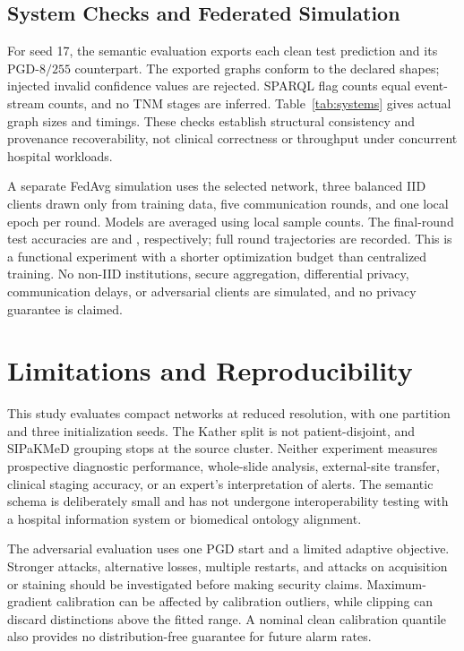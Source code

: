 \documentclass{svproc}
\begin{document}
\subsection{System Checks and Federated Simulation}

For seed 17, the semantic evaluation exports each clean test prediction and its PGD-$8/255$ counterpart. The exported graphs conform to the declared shapes; injected invalid confidence values are rejected. SPARQL flag counts equal event-stream counts, and no TNM stages are inferred. Table~\ref{tab:systems} gives actual graph sizes and timings. These checks establish structural consistency and provenance recoverability, not clinical correctness or throughput under concurrent hospital workloads.

A separate FedAvg simulation uses the selected network, three balanced IID clients drawn only from training data, five communication rounds, and one local epoch per round. Models are averaged using local sample counts. The final-round test accuracies are \KFedAcc{} and \SFedAcc{}, respectively; full round trajectories are recorded. This is a functional experiment with a shorter optimization budget than centralized training. No non-IID institutions, secure aggregation, differential privacy, communication delays, or adversarial clients are simulated, and no privacy guarantee is claimed.

\section{Limitations and Reproducibility}
This study evaluates compact networks at reduced resolution, with one partition and three initialization seeds. The Kather split is not patient-disjoint, and SIPaKMeD grouping stops at the source cluster. Neither experiment measures prospective diagnostic performance, whole-slide analysis, external-site transfer, clinical staging accuracy, or an expert's interpretation of alerts. The semantic schema is deliberately small and has not undergone interoperability testing with a hospital information system or biomedical ontology alignment.

The adversarial evaluation uses one PGD start and a limited adaptive objective. Stronger attacks, alternative losses, multiple restarts, and attacks on acquisition or staining should be investigated before making security claims. Maximum-gradient calibration can be affected by calibration outliers, while clipping can discard distinctions above the fitted range. A nominal clean calibration quantile also provides no distribution-free guarantee for future alarm rates.
\end{document}
